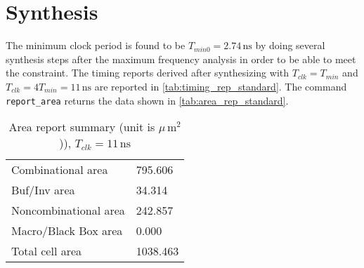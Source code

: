 \chapter{Synthesis}
The minimum clock period is found to be $T_{min0}=2.74\,\textrm{ns}$ by doing several synthesis steps after the maximum frequency analysis in order to be able to meet the constraint. The timing reports derived after synthesizing with $T_{clk}=T_{min}$ and $T_{clk}=4T_{min}=11\,\textrm{ns}$ are reported in \autoref{tab:timing_rep_standard}.
The command \texttt{report\_area} returns the data shown in \autoref{tab:area_rep_standard}.

\begin{table}[htbp]
	\centering
	\begin{tabular}{|l|l|}\hline
		Combinational area&                795.606\\
		Buf/Inv area&                       34.314\\
		Noncombinational area&             242.857\\
		Macro/Black Box area&                0.000\\
		Total cell area&                  1038.463\\\hline
		\end{tabular}
	\caption{Area report summary (unit is $\mu\,\textrm{m}^2$)), $T_{clk} = 11\,\textrm{ns}$}
	\label{tab:area_rep_standard}
\end{table}




